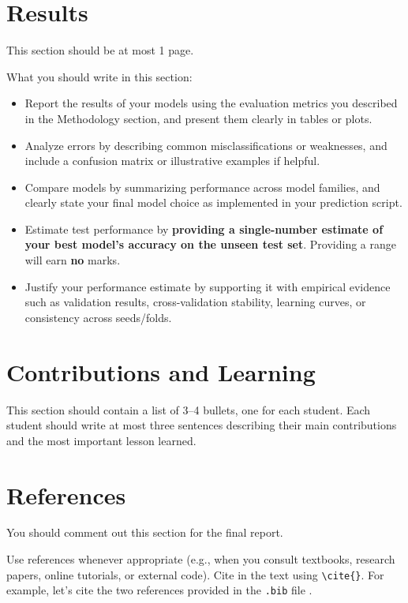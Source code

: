 \documentclass[12pt]{article}
\begin{document}
\section{Results}\label{sec:results}

This section should be at most 1 page.

What you should write in this section:
\begin{itemize}
  \item Report the results of your models using the evaluation metrics you described in the Methodology section, and present them clearly in tables or plots.  
  \item Analyze errors by describing common misclassifications or weaknesses, and include a confusion matrix or illustrative examples if helpful.  
  \item Compare models by summarizing performance across model families, and clearly state your final model choice as implemented in your prediction script.  
  \item Estimate test performance by \textbf{providing a single-number estimate of your best model’s accuracy on the unseen test set}. Providing a range will earn \textbf{no} marks.  
  \item Justify your performance estimate by supporting it with empirical evidence such as validation results, cross-validation stability, learning curves, or consistency across seeds/folds.  
\end{itemize}

\section{Contributions and Learning}

This section should contain a list of 3–4 bullets, one for each student. Each student should write at most three sentences describing their main contributions and the most important lesson learned.

\section{References}

You should comment out this section for the final report.

Use references whenever appropriate (e.g., when you consult textbooks, research papers, online tutorials, or external code). Cite in the text using \verb|\cite{}|. For example, let's cite the two references provided in the \texttt{.bib} file \cite{bishop2006prml,hastie2009esl}.



\end{document}
